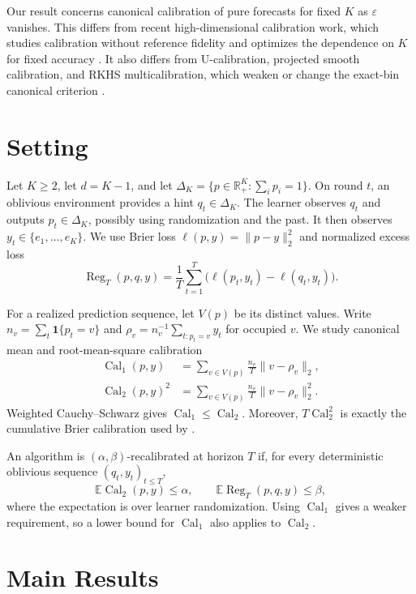 \documentclass[twoside]{article}
\newcommand{\E}{\mathbb E}
\newcommand{\calone}{\operatorname{Cal}_1}
\newcommand{\caltwo}{\operatorname{Cal}_2}
\newcommand{\Reg}{\operatorname{Reg}}
\newcommand{\simplex}{\Delta_K}
\newcommand{\1}{\mathbf 1}
\begin{document}
Our result concerns canonical calibration of pure forecasts for fixed $K$ as $\varepsilon$ vanishes. This differs from recent high-dimensional calibration work, which studies calibration without reference fidelity and optimizes the dependence on $K$ for fixed accuracy \citep{peng2025highdim,fishelson2025highdim}. It also differs from U-calibration, projected smooth calibration, and RKHS multicalibration, which weaken or change the exact-bin canonical criterion \citep{gopalan2024computational,luo2024optimal,farina2026defensive}.

\section{Setting}

Let $K\geq2$, let $d=K-1$, and let $\simplex=\{p\in\mathbb R_+^K:\sum_i p_i=1\}$. On round $t$, an oblivious environment provides a hint $q_t\in\simplex$. The learner observes $q_t$ and outputs $p_t\in\simplex$, possibly using randomization and the past. It then observes $y_t\in\{e_1,\ldots,e_K\}$. We use Brier loss $\ell(p,y)=\|p-y\|_2^2$ \citep{brier1950verification} and normalized excess loss \[ \Reg_T(p,q,y)=\frac1T\sum_{t=1}^T \bigl(\ell(p_t,y_t)-\ell(q_t,y_t)\bigr). \]

For a realized prediction sequence, let $V(p)$ be its distinct values. Write $n_v=\sum_t\1\{p_t=v\}$ and $\rho_v=n_v^{-1}\sum_{t:p_t=v}y_t$ for occupied $v$. We study canonical mean and root-mean-square calibration
\begin{align*}
 \calone(p,y)&=\sum_{v\in V(p)}\frac{n_v}{T}\|v-\rho_v\|_2,\\
 \caltwo(p,y)^2&=\sum_{v\in V(p)}\frac{n_v}{T}\|v-\rho_v\|_2^2.
\end{align*}
Weighted Cauchy--Schwarz gives $\calone\leq\caltwo$. Moreover, $T\caltwo^2$ is exactly the cumulative Brier calibration used by \citet{chen2026calibeating}.

An algorithm is $(\alpha,\beta)$-recalibrated at horizon $T$ if, for every deterministic oblivious sequence $(q_t,y_t)_{t\leq T}$, \[ \E\caltwo(p,y)\leq\alpha, \qquad \E\Reg_T(p,q,y)\leq\beta, \] where the expectation is over learner randomization. Using $\calone$ gives a weaker requirement, so a lower bound for $\calone$ also applies to $\caltwo$.

\section{Main Results}
\end{document}

